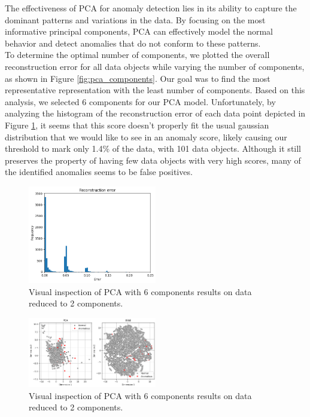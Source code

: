 \documentclass[9pt,twocolumn]{article}
\begin{document}
The effectiveness of PCA for anomaly detection lies in its ability to capture the dominant patterns and variations in the data. By focusing on the most informative principal components, PCA can effectively model the normal behavior and detect anomalies that do not conform to these patterns.\\
To determine the optimal number of components, we plotted the overall reconstruction error for all data objects while varying the number of components, as shown in Figure \ref{fig:pca_components}. Our goal was to find the most representative representation with the least number of components. Based on this analysis, we selected 6 components for our PCA model. Unfortunately, by analyzing the histogram of the reconstruction error of each data point depicted in Figure \ref{fig:PCA_errorhist}, it seems that this score doesn't properly fit the usual gaussian distribution that we would like to see in an anomaly score, likely causing our threshold to mark only 1.4\% of the data, with 101 data objects. Although it still preserves the property of having few data objects with very high scores, many of the identified anomalies seems to be false positives.

\begin{figure}[h]
    \centering
    \includegraphics[width=0.5\textwidth]{images/PCA_errorhist.png}
    \caption{Visual inspection of PCA with 6 components results on data reduced to 2 components.}
    \label{fig:PCA_errorhist}
\end{figure}

\begin{figure}[h]
    \centering
    \includegraphics[width=0.5\textwidth]{images/PCA_PCATSNE.png}
    \caption{Visual inspection of PCA with 6 components results on data reduced to 2 components.}
    \label{fig:pca_pcatsne}
\end{figure}
\end{document}
